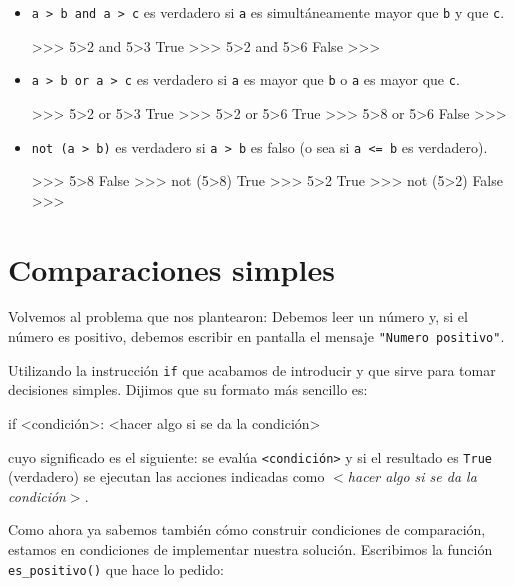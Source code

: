 \begin{itemize}
\item \lstinline!a > b and a > c! es verdadero si \lstinline!a! es
simultáneamente mayor que \lstinline!b! y que \lstinline!c!.

\begin{codigo-python-sn}
>>> 5>2 and 5>3
True
>>> 5>2 and 5>6
False
>>>
\end{codigo-python-sn}

\item \lstinline!a > b or a > c! es verdadero si \lstinline!a! es mayor que
\lstinline!b! o \lstinline!a! es mayor que \lstinline!c!.

\begin{codigo-python-sn}
>>> 5>2 or 5>3
True
>>> 5>2 or 5>6
True
>>> 5>8 or 5>6
False
>>>
\end{codigo-python-sn}

\item \lstinline!not (a > b)! es verdadero si \lstinline!a > b! es falso (o
sea si \lstinline!a <= b! es verdadero).

\begin{codigo-python-sn}
>>> 5>8
False
>>> not (5>8)
True
>>> 5>2
True
>>> not (5>2)
False
>>>
\end{codigo-python-sn}

\end{itemize}

\section{Comparaciones simples}

Volvemos al problema que nos plantearon: Debemos leer un número y, si el
número es positivo, debemos escribir en pantalla el mensaje
 \lstinline!"Numero positivo"!.

Utilizando la instrucción \lstinline!if! que acabamos de introducir y que sirve
para tomar decisiones simples. Dijimos que su formato más sencillo es:

\begin{codigo-python-sn}
if <condición>:
    <hacer algo si se da la condición>
\end{codigo-python-sn}

cuyo significado es el siguiente:
se evalúa \lstinline+<condición>+ y si el resultado es \lstinline!True! (verdadero) se
ejecutan las acciones indicadas como {\it $<$hacer algo si se da la condición$>$}.

Como ahora ya sabemos también cómo construir condiciones de comparación,
estamos en condiciones de implementar nuestra solución. Escribimos la
función \lstinline+es_positivo()+ que hace lo pedido:

